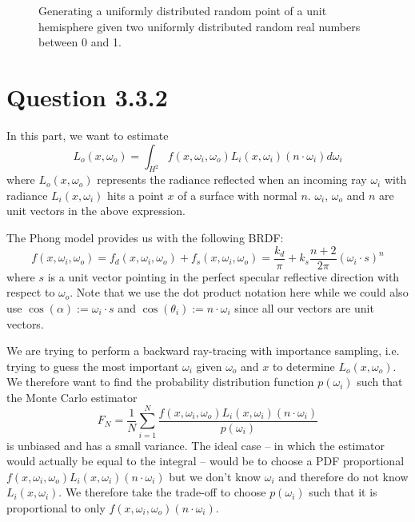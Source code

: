 \documentclass{article}
\begin{document}
\begin{figure}[h]
\centering
{}
\caption{Generating a uniformly distributed random point of a unit hemisphere given two uniformly distributed random real numbers between 0 and 1.}
\label{fig:hemisphere}
\end{figure}

\section*{Question 3.3.2}
In this part, we want to estimate
$$
L_o(x, \omega_o) = \int_{H^2}f(x, \omega_i, \omega_o)L_i(x, \omega_i)(n \cdot \omega_i)d\omega_i
$$
where $L_o(x, \omega_o)$ represents the radiance reflected when an incoming ray $\omega_i$ with radiance $L_i(x, \omega_i)$ hits a point $x$ of a surface with normal $n$. $\omega_i$, $\omega_o$ and $n$ are unit vectors in the above expression.

The Phong model provides us with the following BRDF:
$$
f(x, \omega_i, \omega_o) = f_d(x, \omega_i, \omega_o) + f_s(x, \omega_i, \omega_o) = \frac{k_d}{\pi} + k_s\frac{n + 2}{2\pi}(\omega_i \cdot s)^n
$$
where $s$ is a unit vector pointing in the perfect specular reflective direction with respect to $\omega_o$. Note that we use the dot product notation here while we could also use $\cos{(\alpha)} := \omega_i \cdot s$ and $\cos{(\theta_i)} := n \cdot \omega_i$ since all our vectors are unit vectors.

We are trying to perform a backward ray-tracing with importance sampling, i.e. trying to guess the most important $\omega_i$ given $\omega_o$ and $x$ to determine $L_o(x, \omega_o)$. We therefore want to find the probability distribution function $p(\omega_i)$ such that the Monte Carlo estimator
$$F_N = \frac{1}{N}\sum\limits_{i=1}^N\frac{f(x, \omega_i, \omega_o)L_i(x, \omega_i)(n \cdot \omega_i)}{p(\omega_i)}
$$
is unbiased and has a small variance. The ideal case -- in which the estimator would actually be equal to the integral -- would be to choose a PDF proportional $f(x, \omega_i, \omega_o)L_i(x, \omega_i)(n \cdot \omega_i)$ but we don't know $\omega_i$ and therefore do not know $L_i(x, \omega_i)$. We therefore take the trade-off to choose $p(\omega_i)$ such that it is proportional to only $f(x, \omega_i, \omega_o)(n \cdot \omega_i)$.
\end{document}
